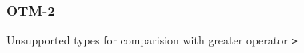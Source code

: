 \subsubsection{OTM-2}\label{sec:error_code_otm_2}

Unsupported types for comparision with greater operator \texttt{>}


